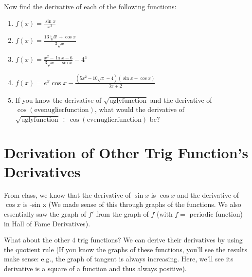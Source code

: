 \documentclass{ximera}
\begin{document}
\begin{question}
Now find the derivative of each of the following functions:
\begin{enumerate}
    \item $f(x) = \frac{\sin x }{x^3}$
    \item $f(x) = \frac{13\sqrt[5]{x} + \cos x}{3\sqrt{x}}$
    \item $f(x) = \frac{x^2-\ln x - 6}{3\sqrt{x} - \sin x} - 4^x$
    \item $f(x) = e^x \cos x - \frac{(5x^2-10\sqrt{x}-4)(\sin x - \cos x)}{3x+2}$
    \item If you know the derivative of $\sqrt{\text{uglyfunction}}$ and the derivative of  $\cos(\text{evenuglierfunction})$, what would the derivative of  $\sqrt{\text{uglyfunction}} \div \cos(\text{evenuglierfunction})$  be?
\end{enumerate}
\end{question}



\section*{Derivation of Other Trig Function's Derivatives}

From class, we know that the derivative of $\sin x$ is $\cos x$ and the derivative of $\cos x$ is 
-sin x (We made sense of this through graphs of the functions.  We also essentially saw the graph of $f'$  from the graph of $f$ (with $f =$ periodic function) in Hall of Fame Derivatives).

What about the other $4$ trig functions?  We can derive their derivatives by using the quotient rule (If you know the graphs of these functions, you'll see the results make sense: e.g., the graph of tangent is always increasing.  Here, we'll see its derivative is a square of a function and thus always positive).  
\end{document}
